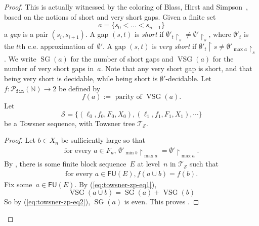 \documentclass[10pt,a4paper]{article}
\def\Tc{\mathcal{T}}
\def\Sc{\mathcal{S}}
\newcommand{\uh}{\upharpoonright}
\newcommand{\NN}[0]{\mathbb{N}}
\newcommand{\SG}{\operatorname{SG}} %
\newcommand{\VSG}{\operatorname{VSG}} %
\newcommand{\Pfin}{\mathcal{P}_{\mathtt{fin}}}
\newcommand{\FU}[0]{\mathsf{FU}} %
\numberwithin{theorem}{section}
\newtheorem{proposition}[theorem]{Proposition}
\newtheorem{claim}{Claim}
\begin{document}
\begin{proof}
This is actually witnessed by the coloring of Blass, Hirst and Simpson~\cite{blassLogicalAnalysisTheorems1987}, based on the notions of short and very short gaps. 
Given a finite set 
$$a  = \{ s_0 < \dots < s_{n-1} \}$$
a \emph{gap} is a pair $(s_i, s_{i+1})$.
A gap $(s, t)$ is \emph{short} if $\emptyset'_t \uh_s \neq \emptyset' \uh_s$, where $\emptyset'_t$ is the $t$th c.e. approximation of~$\emptyset'$. A gap $(s, t)$ is \emph{very short} if $\emptyset'_t \uh s \neq \emptyset'_{\max a} \uh_s$. We write $\SG(a)$ for the number of short gaps and $\VSG(a)$ for the number of very short gaps in~$a$. 
Note that any very short gap is short, and that being very short is decidable, while being short is $\emptyset'$-decidable. Let $f : \Pfin(\NN) \to 2$ be defined by 
$$f(a) := \text{ parity of } \VSG(a).$$
Let
$$\Sc = \{ (\ell_0, f_0, F_0, X_0), (\ell_1, f_1, F_1, X_1), \cdots \}$$
be a Towsner sequence, with Towsner tree $\Tc_{\Sc}$.


\begin{proof}
Let $b \in X_n$ be sufficiently large so that 
\begin{align}\label{eq:towsner-zp-eq1}
    \text{for every $a \in F_n$, }  \emptyset'_{\min b} \uh_{\max a} = \emptyset' \uh_{\max a}.
\end{align}
By , there is some finite block sequence~$E$ at level~$n$ in $\Tc_{\Sc}$ such that
\begin{align}\label{eq:towsner-zp-eq2}
    \text{for every } a \in \FU(E), f(a \cup b) = f(b).
\end{align}
Fix some~$a \in \FU(E)$. By (\ref{eq:towsner-zp-eq1}),
$$
\VSG(a \cup b) = \SG(a) + \VSG(b)
$$
So by (\ref{eq:towsner-zp-eq2}), $\SG(a)$ is even. This proves .
\end{proof}


\end{proof}
\end{document}
